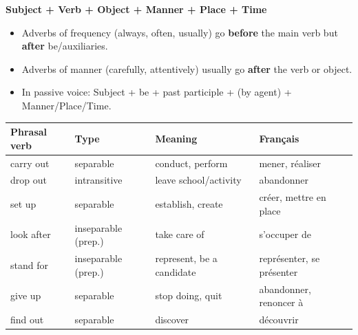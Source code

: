 \documentclass[11pt]{article}
\begin{document}
\begin{propriete}
\textbf{Subject + Verb + Object + Manner + Place + Time}\\
\begin{itemize}
\item Adverbs of frequency (always, often, usually) go \textbf{before} the main verb but \textbf{after} be/auxiliaries.
\item Adverbs of manner (carefully, attentively) usually go \textbf{after} the verb or object.
\item In passive voice: Subject + be + past participle + (by agent) + Manner/Place/Time.
\end{itemize}
\end{propriete}

\begin{propriete}
\begin{center}
\begin{tabularx}{\linewidth}{|l|l|X|l|}\hline
\textbf{Phrasal verb} & \textbf{Type} & \textbf{Meaning} & \textbf{Français} \\ \hline
carry out & separable & conduct, perform & mener, réaliser \\
drop out & intransitive & leave school/activity & abandonner \\
set up & separable & establish, create & créer, mettre en place \\
look after & inseparable (prep.) & take care of & s'occuper de \\
stand for & inseparable (prep.) & represent, be a candidate & représenter, se présenter \\
give up & separable & stop doing, quit & abandonner, renoncer à \\
find out & separable & discover & découvrir \\ \hline
\end{tabularx}
\end{center}
\end{propriete}
\end{document}
